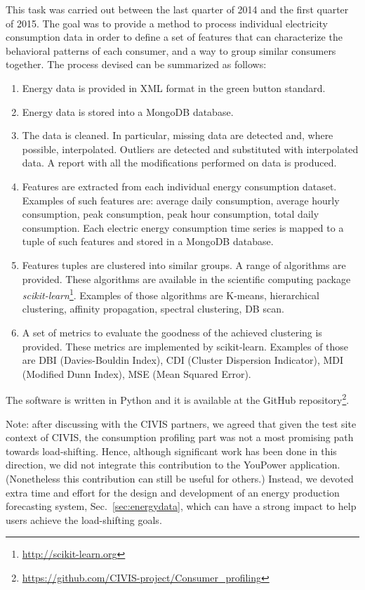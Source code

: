 This task was carried out between the last quarter of 2014 and the first quarter of 2015.
The goal was to provide a method to process individual electricity consumption
data in order to define a set of features that can characterize the behavioral patterns of each
consumer, and a way to group similar consumers together. The process devised can be summarized
as follows:

\begin{enumerate} 
\item Energy data is provided in XML format in the green button standard.

\item Energy data is stored into a MongoDB database.

\item The data is cleaned. In particular, missing data are detected and, where possible, interpolated. Outliers are detected and substituted with interpolated data. A report with all the modifications performed on
data is produced. 

\item Features are extracted from each individual energy consumption dataset. Examples of such
features are: average daily consumption, average hourly consumption, peak consumption, peak hour
consumption, total daily consumption. Each electric energy consumption time series is mapped to a
tuple of such features and stored in a MongoDB database.

\item Features tuples are clustered into similar groups. A range of algorithms are provided. These
algorithms are available in the scientific computing package \textit{scikit-learn}\footnote{\url{http://scikit-learn.org}}. Examples of those algorithms are K-means,
hierarchical clustering, affinity propagation, spectral clustering, DB scan.

\item A set of metrics to evaluate the goodness of the achieved clustering is provided. These metrics are implemented by scikit-learn. Examples of those are 
DBI (Davies-Bouldin Index),
CDI  (Cluster Dispersion Indicator),
MDI (Modified Dunn Index),
MSE (Mean Squared Error).
\end{enumerate}

The software is written in Python and it is available at the GitHub repository\footnote{\url{https://github.com/CIVIS-project/Consumer_profiling}}.

Note: after discussing with the CIVIS partners, we agreed that given the test site context of CIVIS, the consumption profiling part was not a most promising path towards load-shifting. Hence, although significant work has been done in this direction, we did not integrate this contribution to the YouPower application. (Nonetheless this contribution can still be useful for others.)
Instead, we devoted extra time and effort for the design and development of an energy production forecasting
system, Sec.~\ref{sec:energydata}, which can have a strong impact to help users achieve the load-shifting goals.

